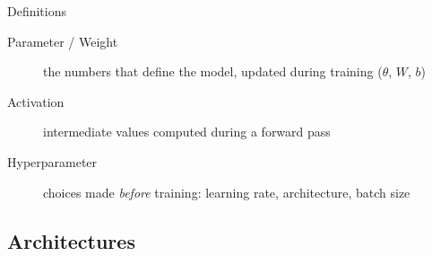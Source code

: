 \begin{frame}{Definitions}
\begin{description}
\item[Parameter / Weight] the numbers that define the model, updated during training ($\theta$, $W$, $b$)
\item[Activation] intermediate values computed during a forward pass
\item[Hyperparameter] choices made \emph{before} training: learning rate, architecture, batch size
\end{description}
\end{frame}

\subsection{Architectures}


